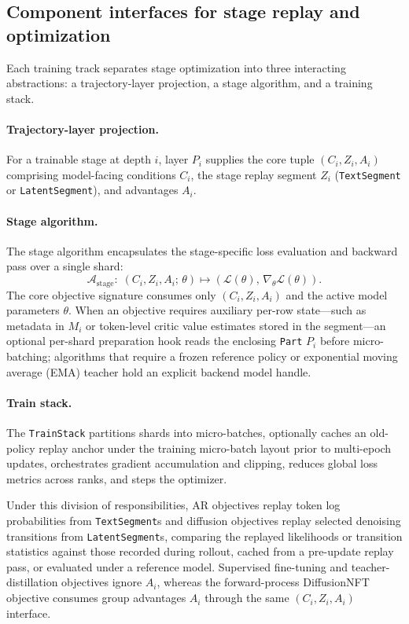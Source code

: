 \documentclass[10pt]{article}
\newcommand{\parttype}{\texttt{Part}}
\begin{document}
\subsection{Component interfaces for stage replay and optimization}
\label{sec:algorithm-boundary}

Each training track separates stage optimization into three interacting abstractions: a trajectory-layer projection, a stage algorithm, and a training stack.

\paragraph{Trajectory-layer projection.}
For a trainable stage at depth $i$, layer $P_i$ supplies the core tuple $(C_i, Z_i, A_i)$ comprising model-facing conditions $C_i$, the stage replay segment $Z_i$ (\texttt{TextSegment} or \texttt{LatentSegment}), and advantages $A_i$.

\paragraph{Stage algorithm.}
The stage algorithm encapsulates the stage-specific loss evaluation and backward pass over a single shard:
\begin{equation}
\mathcal{A}_{\mathrm{stage}}:\; (C_i, Z_i, A_i;\,\theta) \longmapsto (\mathcal{L}(\theta),\, \nabla_\theta \mathcal{L}(\theta)).
\label{eq:algorithm}
\end{equation}
The core objective signature consumes only $(C_i, Z_i, A_i)$ and the active model parameters $\theta$.
When an objective requires auxiliary per-row state---such as metadata in $M_i$ or token-level critic value estimates stored in the segment---an optional per-shard preparation hook reads the enclosing \parttype{} $P_i$ before micro-batching; algorithms that require a frozen reference policy or exponential moving average (EMA) teacher hold an explicit backend model handle.

\paragraph{Train stack.}
The \texttt{TrainStack} partitions shards into micro-batches, optionally caches an old-policy replay anchor under the training micro-batch layout prior to multi-epoch updates, orchestrates gradient accumulation and clipping, reduces global loss metrics across ranks, and steps the optimizer.

Under this division of responsibilities, AR objectives replay token log probabilities from \texttt{TextSegment}s and diffusion objectives replay selected denoising transitions from \texttt{LatentSegment}s, comparing the replayed likelihoods or transition statistics against those recorded during rollout, cached from a pre-update replay pass, or evaluated under a reference model.
Supervised fine-tuning and teacher-distillation objectives ignore $A_i$, whereas the forward-process DiffusionNFT objective consumes group advantages $A_i$ through the same $(C_i, Z_i, A_i)$ interface.
\end{document}
